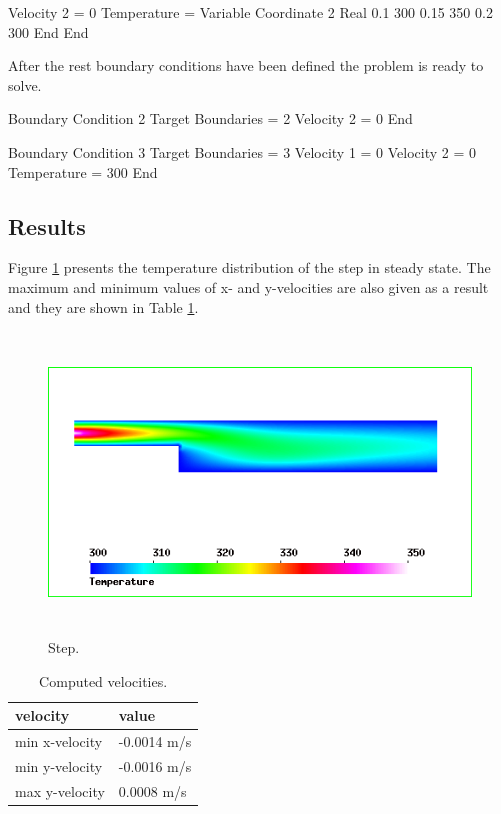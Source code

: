 \begin{flushleft}
  Velocity 2 = 0
  Temperature = Variable Coordinate 2
    Real 
      0.1    300
      0.15   350
      0.2    300
    End
End
\ttend

After the rest boundary conditions have been defined the problem is ready to solve.

\ttbegin
Boundary Condition 2
  Target Boundaries = 2
  Velocity 2 = 0
End

Boundary Condition 3
  Target Boundaries = 3
  Velocity 1 = 0
  Velocity 2 = 0
  Temperature = 300
End
\ttend

\subsection*{Results}

Figure \ref{fg:comp_step_temp} presents the temperature distribution of the step in steady state. The maximum and minimum values of x- and y-velocities are also given as a result and they are shown in Table \ref{tb:velocities}.

\begin{figure}[h]
\centering
\includegraphics[height=80mm]{comp_step_temp.png}
\caption{Step.}\label{fg:comp_step_temp}
\end{figure}

\begin{table}[h]
\caption{Computed velocities.}
\label{tb:velocities}
\begin{center}
\begin{tabular}{ll} \hline
velocity  & value \\ \hline
min x-velocity & -0.0014 m/s\\
min y-velocity & -0.0016 m/s        \\
max y-velocity & 0.0008 m/s      \\ \hline
\end{tabular}
\end{center}
\end{table}

\end{flushleft}

\vfill
